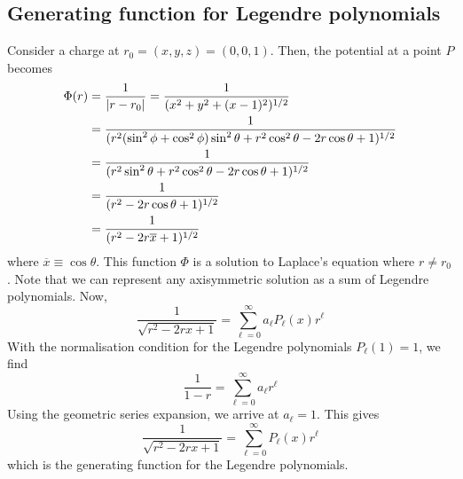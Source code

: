 \subsection{Generating function for Legendre polynomials}
Consider a charge at \( r_0 = (x,y,z) = (0,0,1) \).
Then, the potential at a point \( P \) becomes
\begin{align*}
	\Phi(r) & = \frac{1}{\abs{r - r_0}} = \frac{1}{(x^2 + y^2 + (x-1)^2)^{1/2}}                                         \\
	        & = \frac{1}{(r^2 (\sin^2 \phi + \cos^2 \phi) \sin^2 \theta + r^2 \cos^2 \theta - 2r \cos\theta + 1)^{1/2}} \\
	        & = \frac{1}{(r^2 \sin^2 \theta + r^2 \cos^2 \theta - 2r \cos\theta + 1)^{1/2}}                             \\
	        & = \frac{1}{(r^2 - 2r \cos\theta + 1)^{1/2}}                                                               \\
	        & = \frac{1}{(r^2 - 2r \overline x + 1)^{1/2}}
\end{align*}
where \( \overline x \equiv \cos \theta \).
This function \( \Phi \) is a solution to Laplace's equation where \( r \neq r_0 \).
Note that we can represent any axisymmetric solution as a sum of Legendre polynomials.
Now,
\[
	\frac{1}{\sqrt{r^2 - 2rx + 1}} = \sum_{\ell = 0}^\infty a_\ell P_\ell(x) r^\ell
\]
With the normalisation condition for the Legendre polynomials \( P_\ell(1) = 1 \), we find
\[
	\frac{1}{1-r} = \sum_{\ell=0}^\infty a_\ell r^\ell
\]
Using the geometric series expansion, we arrive at \( a_\ell = 1 \).
This gives
\[
	\frac{1}{\sqrt{r^2 - 2rx + 1}} = \sum_{\ell = 0}^\infty P_\ell(x) r^\ell
\]
which is the generating function for the Legendre polynomials.
